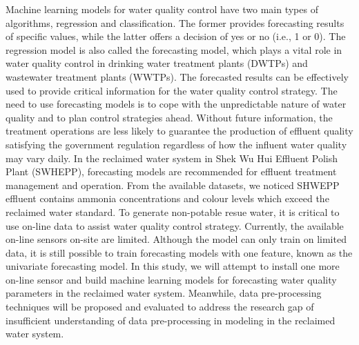 Machine learning models for water quality control have two main types of algorithms, regression and classification. The former provides forecasting results of specific values, while the latter offers a decision of yes or no (i.e., 1 or 0). The regression model is also called the forecasting model, which plays a vital role in water quality control in drinking water treatment plants (DWTPs) and wastewater treatment plants (WWTPs). The forecasted results can be effectively used to provide critical information for the water quality control strategy. The need to use forecasting models is to cope with the unpredictable nature of water quality and to plan control strategies ahead. Without future information, the treatment operations are less likely to guarantee the production of effluent quality satisfying the government regulation \cite{chenAssessingWastewaterReclamation2003} regardless of how the influent water quality may vary daily. In the reclaimed water system in Shek Wu Hui Effluent Polish Plant (SWHEPP), forecasting models are recommended for effluent treatment management and operation. From the available datasets, we noticed SHWEPP effluent contains ammonia concentrations and colour levels which exceed the reclaimed water standard. To generate non-potable resue water, it is critical to use on-line data to assist water quality control strategy. Currently, the available on-line sensors on-site are limited. Although the model can only train on limited data, it is still possible to train forecasting models with one feature, known as the univariate forecasting model. In this study, we will attempt to install one more on-line sensor and build machine learning models for forecasting water quality parameters in the reclaimed water system. Meanwhile, data pre-processing techniques will be proposed and evaluated to address the research gap of insufficient understanding of data pre-processing in modeling in the reclaimed water system.




